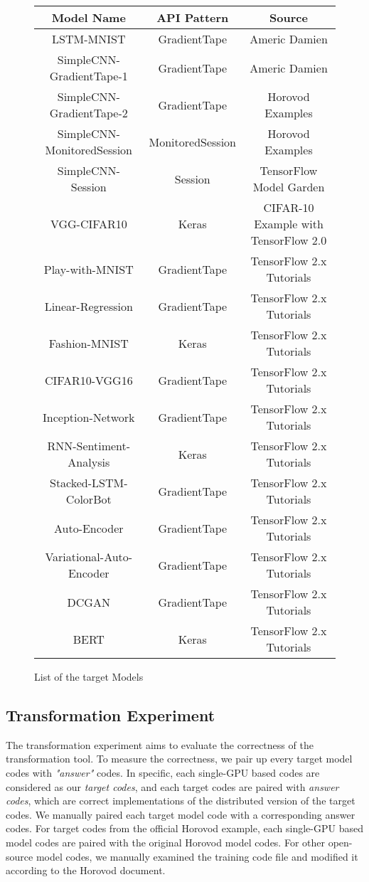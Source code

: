 \begin{figure}[!ht]
  \begin{center}
  \begin{tabular}{|c|c|c|}
    \hline
    Model Name & API Pattern & Source \\
    \hline
    LSTM-MNIST & GradientTape & Americ Damien \\
    SimpleCNN-GradientTape-1 & GradientTape & Americ Damien \\
    SimpleCNN-GradientTape-2 & GradientTape & Horovod Examples \\
    SimpleCNN-MonitoredSession & MonitoredSession & Horovod Examples \\
    SimpleCNN-Session & Session & TensorFlow Model Garden \\
    VGG-CIFAR10 & Keras & CIFAR-10 Example with TensorFlow 2.0 \\
    Play-with-MNIST & GradientTape & TensorFlow 2.x Tutorials \\
    Linear-Regression & GradientTape & TensorFlow 2.x Tutorials \\
    Fashion-MNIST & Keras & TensorFlow 2.x Tutorials \\
    CIFAR10-VGG16 & GradientTape & TensorFlow 2.x Tutorials\\
    Inception-Network & GradientTape & TensorFlow 2.x Tutorials \\
    RNN-Sentiment-Analysis & Keras & TensorFlow 2.x Tutorials \\
    Stacked-LSTM-ColorBot & GradientTape & TensorFlow 2.x Tutorials \\
    Auto-Encoder & GradientTape & TensorFlow 2.x Tutorials \\
    Variational-Auto-Encoder & GradientTape & TensorFlow 2.x Tutorials \\
    DCGAN & GradientTape & TensorFlow 2.x Tutorials \\
    BERT & Keras & TensorFlow 2.x Tutorials \\
    \hline
  \end{tabular}
  \end{center}
  \caption{List of the target Models}
  \label{fig:eval:targets}
\end{figure}

\subsection{Transformation Experiment}

The transformation experiment aims to evaluate the correctness of the
transformation tool. To measure the correctness, we pair up every
target model codes with \textit{"answer"} codes. In specific,      
each single-GPU based codes are considered as our \textit{target codes},
and each target codes are paired with \textit{answer codes}, which are
correct implementations of the distributed version of the target codes. 
We manually paired each target model code with a corresponding answer codes.
For target codes from the official Horovod example, each single-GPU based
model codes are paired with the original Horovod model codes.     
For other open-source model codes, we manually examined the training code
file and modified it according to the Horovod document.


